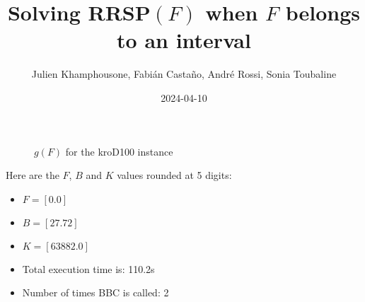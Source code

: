 \documentclass{article}
\begin{document}
     \title{Solving RRSP$(F)$ when $F$ belongs to an interval}
     \author{Julien Khamphousone, Fabi\'an Casta\~no, Andr\'e Rossi, Sonia Toubaline}
     \date{2024-04-10}
     \maketitle
     \def\F{{0.0,0.0}}
\def\gF{{638.82,63882.0}}
\begin{figure}[ht!]
    \begin{center}
    \end{center}
    \vspace*{-2eM}
    \caption{$g(F)$ for the kroD100 instance}\label{fig:1}
    \end{figure}
    Here are the $F$, $B$ and $K$ values rounded at 5 digits:

\begin{itemize}
	\item  $F = [0.0]$
 \item $B = [27.72]$
 \item  $K = [63882.0]$\item Total execution time is: 110.2s\item Number of times BBC is called: 2\end{itemize}
\end{document}
